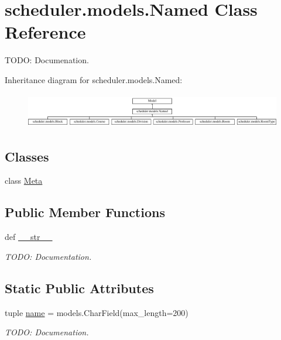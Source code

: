 \hypertarget{classscheduler_1_1models_1_1_named}{\section{scheduler.\-models.\-Named Class Reference}
\label{classscheduler_1_1models_1_1_named}
}


T\-O\-D\-O\-: Documenation.  


Inheritance diagram for scheduler.\-models.\-Named\-:\begin{figure}[H]
\begin{center}
\leavevmode
\includegraphics[height=1.538462cm]{classscheduler_1_1models_1_1_named}
\end{center}
\end{figure}
\subsection*{Classes}
\begin{DoxyCompactItemize}
\item 
class \hyperlink{classscheduler_1_1models_1_1_named_1_1_meta}{Meta}
\end{DoxyCompactItemize}
\subsection*{Public Member Functions}
\begin{DoxyCompactItemize}
\item 
\hypertarget{classscheduler_1_1models_1_1_named_a37b97c2fa4acbf5c61ca4cdff1410d47}{def \hyperlink{classscheduler_1_1models_1_1_named_a37b97c2fa4acbf5c61ca4cdff1410d47}{\-\_\-\-\_\-str\-\_\-\-\_\-}}\label{classscheduler_1_1models_1_1_named_a37b97c2fa4acbf5c61ca4cdff1410d47}

\begin{DoxyCompactList}\small\item\em T\-O\-D\-O\-: Documentation. \end{DoxyCompactList}\end{DoxyCompactItemize}
\subsection*{Static Public Attributes}
\begin{DoxyCompactItemize}
\item 
\hypertarget{classscheduler_1_1models_1_1_named_a5e5e18340ced82b633c6c913447d602f}{tuple \hyperlink{classscheduler_1_1models_1_1_named_a5e5e18340ced82b633c6c913447d602f}{name} = models.\-Char\-Field(max\-\_\-length=200)}\label{classscheduler_1_1models_1_1_named_a5e5e18340ced82b633c6c913447d602f}

\begin{DoxyCompactList}\small\item\em T\-O\-D\-O\-: Documenation. \end{DoxyCompactList}\end{DoxyCompactItemize}


